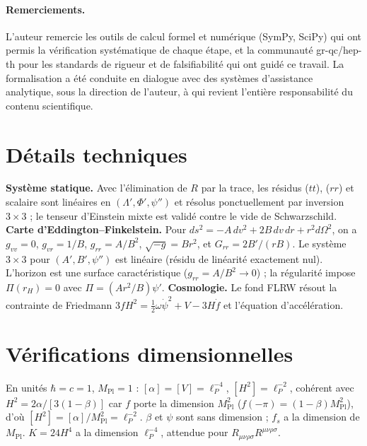 \documentclass[11pt,a4paper]{article}
\newcommand{\Mpl}{M_{\mathrm{Pl}}}
\theoremstyle{plain}
\theoremstyle{remark}
\renewcommand{\thesection}{\Roman{section}}
\begin{document}
\paragraph{Remerciements.} L'auteur remercie les outils de calcul formel et num\'erique
(SymPy, SciPy) qui ont permis la v\'erification syst\'ematique de chaque \'etape, et la
communaut\'e gr-qc/hep-th pour les standards de rigueur et de falsifiabilit\'e qui ont guid\'e
ce travail. La formalisation a \'et\'e conduite en dialogue avec des syst\`emes d'assistance
analytique, sous la direction de l'auteur, \`a qui revient l'enti\`ere responsabilit\'e du
contenu scientifique.

\appendix
\renewcommand{\thesection}{\Alph{section}}
\section{D\'etails techniques}
\textbf{Syst\`eme statique.} Avec l'\'elimination de $R$ par la trace, les r\'esidus
($tt$), ($rr$) et scalaire sont lin\'eaires en $(\Lambda',\Phi',\psi'')$ et r\'esolus
ponctuellement par inversion $3\times3$ ; le tenseur d'Einstein mixte est valid\'e contre
le vide de Schwarzschild. \textbf{Carte d'Eddington--Finkelstein.} Pour
$ds^2=-A\,dv^2+2B\,dv\,dr+r^2d\Omega^2$, on a $g_{vv}=0$, $g_{vr}=1/B$, $g_{rr}=A/B^2$,
$\sqrt{-g}=Br^2$, et $G_{rr}=2B'/(rB)$. Le syst\`eme $3\times3$ pour $(A',B',\psi'')$ est
lin\'eaire (r\'esidu de lin\'earit\'e exactement nul). L'horizon est une surface
caract\'eristique ($g_{rr}=A/B^2\to0$) ; la r\'egularit\'e impose $\Pi(r_H)=0$ avec
$\Pi=(Ar^2/B)\psi'$. \textbf{Cosmologie.} Le fond FLRW r\'esout la contrainte de Friedmann
$3fH^2=\tfrac12\omega\dot\psi^2+V-3H\dot f$ et l'\'equation d'acc\'el\'eration.

\section{V\'erifications dimensionnelles}
En unit\'es $\hbar=c=1$, $\Mpl=1$ : $[\alpha]=[V]=\ell_P^{-4}$, $[H^2]=\ell_P^{-2}$,
coh\'erent avec $H^2=2\alpha/[3(1-\beta)]$ car $f$ porte la dimension $\Mpl^2$
($f(-\pi)=(1-\beta)\Mpl^2$), d'o\`u $[H^2]=[\alpha]/\Mpl^2=\ell_P^{-2}$. $\beta$ et $\psi$
sont sans dimension ; $f_s$ a la dimension de $\Mpl$. $K=24H^4$ a la dimension
$\ell_P^{-4}$, attendue pour $R_{\mu\nu\rho\sigma}R^{\mu\nu\rho\sigma}$.
\end{document}
